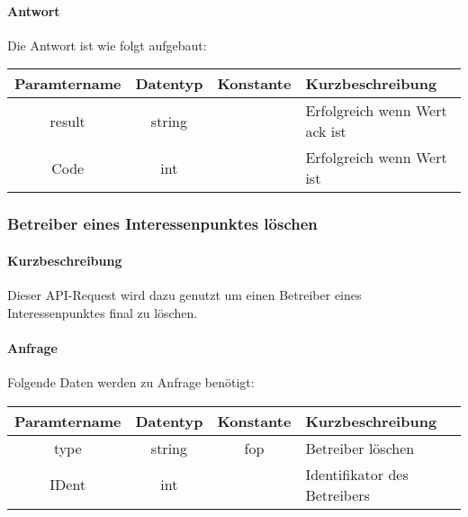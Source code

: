 \paragraph{Antwort}Die Antwort ist wie folgt aufgebaut:
\begin{table}[H]
	\begin{tabular}{|c|c|c|p{6.5cm}|}
		\hline
		\textbf{Paramtername} & \textbf{Datentyp} & \textbf{Konstante} & \textbf{Kurzbeschreibung}                                                                                               \\ \hline
		result              & string           &                 & Erfolgreich wenn Wert {\glqq ack\grqq} ist \\ \hline
		Code                & int              &                 & Erfolgreich wenn Wert {\glqq 0\grqq} ist \\ \hline
	\end{tabular}
\end{table}
\subsubsection{Betreiber eines Interessenpunktes löschen}
\paragraph{Kurzbeschreibung}Dieser API-Request wird dazu genutzt um einen Betreiber eines Interessenpunktes final zu löschen.
\paragraph{Anfrage}Folgende Daten werden zu Anfrage benötigt:
\begin{table}[H]
	\begin{tabular}{|c|c|c|p{6.5cm}|}
		\hline
		\textbf{Paramtername} & \textbf{Datentyp} & \textbf{Konstante} & \textbf{Kurzbeschreibung}                                                                                               \\ \hline
		type                & string            & fop                & Betreiber löschen \\ \hline
		IDent               & int               &                    & Identifikator des Betreibers \\ \hline
	\end{tabular}
\end{table}

